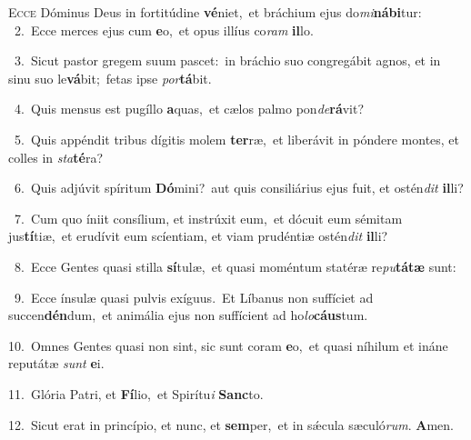 \lettrine{\initial\textcolor{\initialcolor}{E}}{cce} Dóminus Deus in fortitúdine \textbf{vé}\-niet,~\star et bráchium ejus do\-\textit{mi}\-\textbf{ná}\textbf{bi}tur:\\
{\numbfont\textcolor{\numbcolor}{~2.}}~Ecce merces ejus cum \textbf{e}\-o,~\star et opus illíus co\textit{ram} \textbf{il}\-lo.\par
{\numbfont\textcolor{\numbcolor}{~3.}}~Sicut pastor gregem suum pascet:~\dagger in bráchio suo congregábit agnos, et in sinu suo le\-\textbf{vá}\-bit;~\star fetas ipse \textit{por}\-\textbf{tá}bit.\par
{\numbfont\textcolor{\numbcolor}{~4.}}~Quis mensus est pugíllo \textbf{a}\-quas,~\star et cælos palmo pon\-\textit{de}\-\textbf{rá}vit?\par
{\numbfont\textcolor{\numbcolor}{~5.}}~Quis appéndit tribus dígitis molem \textbf{ter}\-ræ,~\star et liberávit in póndere montes, et colles in \textit{sta}\-\textbf{té}ra?\par
{\numbfont\textcolor{\numbcolor}{~6.}}~Quis adjúvit spíritum \textbf{Dó}\-mini?~\star aut quis consiliárius ejus fuit, et ostén\textit{dit} \textbf{il}\-li?\par
{\numbfont\textcolor{\numbcolor}{~7.}}~Cum quo íniit consílium, et instrúxit eum,~\dagger et dócuit eum sémitam jus\-\textbf{tí}\-tiæ,~\star et erudívit eum scíentiam, et viam prudéntiæ ostén\textit{dit} \textbf{il}\-li?\par
{\numbfont\textcolor{\numbcolor}{~8.}}~Ecce Gentes quasi stilla \textbf{sí}\-tulæ,~\star et quasi moméntum statéræ re\-\textit{pu}\-\textbf{tá}\textbf{tæ} sunt:\par
{\numbfont\textcolor{\numbcolor}{~9.}}~Ecce ínsulæ quasi pulvis exíguus.~\dagger Et Líbanus non suffíciet ad succen\-\textbf{dén}\-dum,~\star et animália ejus non suffícient ad ho\-\textit{lo}\-\textbf{cáus}tum.\par
{\numbfont\textcolor{\numbcolor}{10.}}~Omnes Gentes quasi non sint, sic sunt coram \textbf{e}\-o,~\star et quasi níhilum et ináne reputátæ \textit{sunt} \textbf{e}\-i.\par
{\numbfont\textcolor{\numbcolor}{11.}}~Glória Patri, et \textbf{Fí}\-lio,~\star et Spirítu\textit{i} \textbf{Sanc}\-to.\par
{\numbfont\textcolor{\numbcolor}{12.}}~Sicut erat in princípio, et nunc, et \textbf{sem}\-per,~\star et in sǽcula sæculó\-\textit{rum}\-. \textbf{A}\-men.\par
